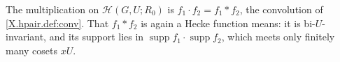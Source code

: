 The multiplication on $\mathcal H(G,U;R_0)$ is $f_1\cdot f_2=f_1*f_2$, the convolution of \cref{X.hpair.def:conv}. That $f_1*f_2$ is again a Hecke function means: it is bi-$U$-invariant, and its support lies in $\operatorname{supp}f_1\cdot\operatorname{supp}f_2$, which meets only finitely many cosets $xU$.
